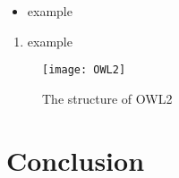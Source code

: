 
\begin{itemize}
\item example
\end {itemize}



    \begin{enumerate}
    \item example
 
    \end{enumerate}
    

    

\begin{figure}[h]
   \centering
   \texttt{[image: OWL2]}
    \caption{The structure of OWL2}
    \label{fig:OWL2}
\end{figure}


	
	
\section{Conclusion}
\label {conclusion}

